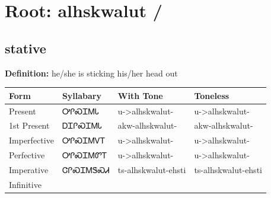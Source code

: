 \documentclass{article}%
\begin{document}
%
\normalsize%
\section*{Root: alhskwalut / }%
\subsection*{stative}%
\textbf{Definition: }%
he/she is sticking his/her head out%
\\[0.5em]%
\begin{tabular}{|l|l|l|l|}%
\hline%
\textbf{Form}&\textbf{Syllabary}&\textbf{With Tone}&\textbf{Toneless}\\%
\hline%
Present&ᎤᎵᏍᏆᎷᏓ&u{-}>alhskwalut{-}&u{-}>alhskwalut{-}\\%
1st Present&ᎠᏆᎵᏍᏆᎷᏓ&akw{-}alhskwalut{-}&akw{-}alhskwalut{-}\\%
Imperfective&ᎤᎵᏍᏆᎷᏙᎢ&u{-}>alhskwalut{-}&u{-}>alhskwalut{-}\\%
Perfective&ᎤᎵᏍᏆᎷᏛᎢ&u{-}>alhskwalut{-}&u{-}>alhskwalut{-}\\%
Imperative&ᏣᎵᏍᏆᎷᏕᏍᏗ&ts{-}alhskwalut{-}ehsti&ts{-}alhskwalut{-}ehsti\\%
Infinitive&&&\\%
\hline%
\end{tabular}%
\\[1em]%
\end{document}
